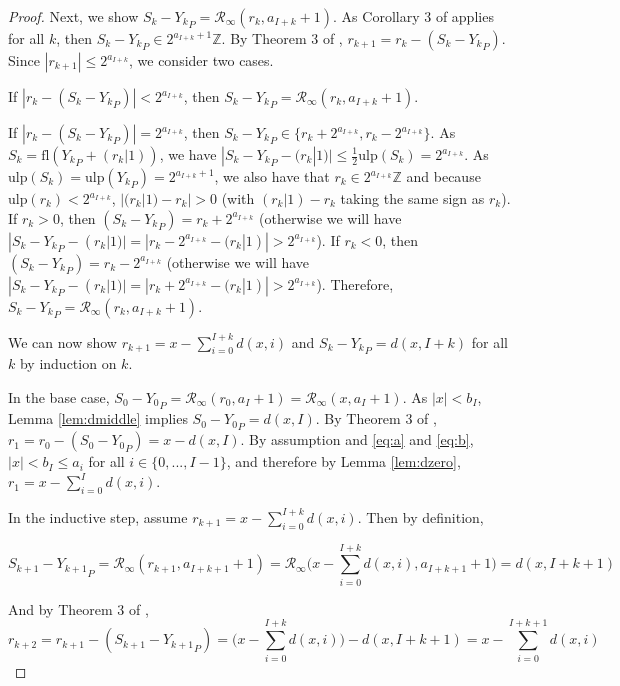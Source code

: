 \documentclass[12pt]{article}
\providecommand{\Z}{\ensuremath{\mathbb{Z}}}
\providecommand{\ulp}{\ensuremath{\text{ulp}}}
\providecommand{\fl}{\ensuremath{\text{fl}}}
\providecommand{\roundtonearestinfty}{\ensuremath{\mathcal{R}_\text{$\infty$}}}
\theoremstyle{definition}
\numberwithin{equation}{section}
\numberwithin{figure}{section}
\begin{document}
\begin{proof}
        Next, we show $S_k - {Y_k}_P = \roundtonearestinfty(r_k, a_{I + k} + 1)$. As Corollary 3 of \cite{repsum} applies for all $k$, then $S_k - {Y_k}_P \in 2^{a_{I + k} + 1}\Z$. By Theorem 3 of \cite{repsum}, $r_{k + 1} = r_k - (S_k - {Y_k}_P)$. Since $|r_{k + 1}| \leq 2^{a_{I + k}}$, we consider two cases.

        If $|r_k - (S_k - {Y_k}_P)| < 2^{a_{I + k}}$, then $S_k - {Y_k}_P = \roundtonearestinfty(r_k, a_{I + k} + 1)$.

        If $|r_k - (S_k - {Y_k}_P)| = 2^{a_{I + k}}$, then $S_k - {Y_k}_P \in \{r_k + 2^{a_{I + k}},  r_k - 2^{a_{I + k}}\}$.
        As $S_k = \fl({Y_k}_P + (r_k|1))$, we have $|S_k - {Y_k}_P - (r_k|1)| \leq \frac{1}{2}\ulp(S_k) = 2^{a_{I + k}}$.  As $\ulp(S_k) = \ulp({Y_k}_P) = 2^{a_{I + k} + 1}$, we also have that $r_k \in 2^{a_{I + k}}\Z$  and because $\ulp(r_k) < 2^{a_{I + k}}$, $|(r_k|1) - r_k| > 0$ (with $(r_k|1) - r_k$ taking the same sign as $r_k$).
        If $r_k > 0$, then $(S_k - {Y_k}_P) = r_k + 2^{a_{I + k}}$ (otherwise we will have $|S_k - {Y_k}_P - (r_k|1)| = |r_k - 2^{a_{I + k}} - (r_k|1)| > 2^{a_{I + k}}$).
        If $r_k < 0$, then $(S_k - {Y_k}_P) = r_k - 2^{a_{I + k}}$ (otherwise we will have $|S_k - {Y_k}_P - (r_k|1)| = |r_k + 2^{a_{I + k}} - (r_k|1)| > 2^{a_{I + k}}$). Therefore, $S_k - {Y_k}_P = \roundtonearestinfty(r_k, a_{I + k} + 1)$.

        We can now show $r_{k + 1} = x - \sum\limits_{i = 0}^{I + k}d(x, i)$ and $S_k - {Y_k}_P = d(x, I + k)$ for all $k$ by induction on $k$.

        In the base case, $S_0 - {Y_0}_P = \roundtonearestinfty(r_0, a_I + 1) = \roundtonearestinfty(x, a_I + 1)$. As $|x| < b_I$, Lemma \ref{lem:dmiddle} implies $S_0 - {Y_0}_P = d(x, I)$. By Theorem 3 of \cite{repsum}, $r_1 = r_0 - (S_0 - {Y_0}_P) = x - d(x,I)$. By assumption and  \eqref{eq:a} and \eqref{eq:b}, $|x| < b_I \leq a_{i}$ for all $i \in \{0, ..., I - 1\}$, and therefore by Lemma \ref{lem:dzero}, $r_1 = x - \sum\limits_{i = 0}^Id(x, i)$.

        In the inductive step, assume $r_{k + 1} = x - \sum\limits_{i = 0}^{I + k}d(x, i)$. Then by definition,

        \begin{equation*}
          S_{k + 1} - {Y_{k + 1}}_P = \roundtonearestinfty(r_{k + 1}, a_{I + k + 1} + 1) = \roundtonearestinfty\bigl(x - \sum\limits_{i = 0}^{I + k}d(x, i), a_{I + k + 1} + 1\bigr) = d(x, I + k + 1)
        \end{equation*}

        And by Theorem 3 of \cite{repsum},
        \begin{equation*}
          r_{k + 2} = r_{k + 1} - (S_{k + 1} - {Y_{k + 1}}_P) = \bigl(x - \sum\limits_{i = 0}^{I + k}d(x, i)\bigr) - d(x, I + k + 1) = x - \sum\limits_{i = 0}^{I + k + 1}d(x, i)
        \end{equation*}
      \end{proof}
\end{document}
